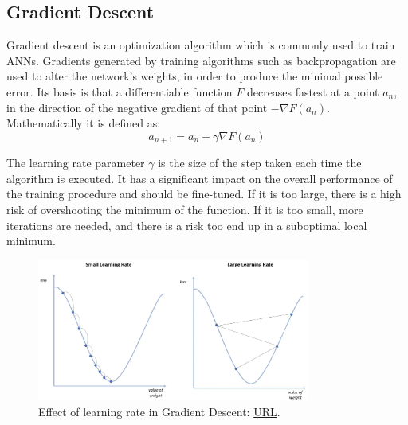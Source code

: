 \subsection{Gradient Descent}
Gradient descent\cite{IBM_Gradient_Descent, gradient_descent_wiki} is an optimization algorithm which is commonly used to train ANNs. Gradients generated by training algorithms such as backpropagation are used to alter the network's weights, in order to produce the minimal possible error. Its basis is that a differentiable function \(F\) decreases fastest at a point \(a_n\), in the direction of the negative gradient of that point \(-\nabla F \left( a_n \right)\). Mathematically it is defined as:
\begin{equation}
a_{n+1} = a_n - \gamma \nabla F \left( a_n \right)
	\label{eqn:Gradient Descent}
\end{equation}

The learning rate parameter \(\gamma\) is the size of the step taken each time the algorithm is executed. It has a significant impact on the overall performance of the training procedure and should be fine-tuned. If it is too large, there is a high risk of overshooting the minimum of the function. If it is too small, more iterations are needed, and there is a risk too end up in a suboptimal local minimum.
\begin{figure}[H]
    \centering
        \includegraphics[width=0.8\textwidth]{Images/diagrams/learning_rate.png}
        \decoRule
        \caption[Effect of learning rate in Gradient Descent]{Effect of learning rate in Gradient Descent: \href{https://www.ibm.com/cloud/learn/gradient-descent}{URL}.}
        \label{fig:Learning rate in Gradient Descent}
\end{figure}

